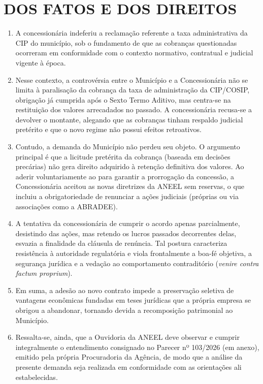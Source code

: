 \newcommand{\tipoRequerimento}{Taxa administrativa da CIP}

\section{DOS FATOS E DOS DIREITOS}

\begin{enumerate}[resume]
    \item A concessionária indeferiu a reclamação referente a taxa administrativa da CIP do município, sob o fundamento de que as cobranças questionadas ocorreram em conformidade com o contexto normativo, contratual e judicial vigente à época.

    \item Nesse contexto, a controvérsia entre o Município e a Concessionária não se limita à paralisação da cobrança da taxa de administração da CIP/COSIP, obrigação já cumprida após o Sexto Termo Aditivo, mas centra-se na restituição dos valores arrecadados no passado. A concessionária recusa-se a devolver o montante, alegando que as cobranças tinham respaldo judicial pretérito e que o novo regime não possui efeitos retroativos.

    \item Contudo, a demanda do Município não perdeu seu objeto. O argumento principal é que a licitude pretérita da cobrança (baseada em decisões precárias) não gera direito adquirido à retenção definitiva dos valores. Ao aderir voluntariamente ao \termoCIP{} para garantir a prorrogação da concessão, a Concessionária aceitou as novas diretrizes da ANEEL sem reservas, o que incluiu a obrigatoriedade de renunciar a ações judiciais (próprias ou via associações como a ABRADEE).

    \item A tentativa da concessionária de cumprir o acordo apenas parcialmente, desistindo das ações, mas retendo os lucros passados decorrentes delas, esvazia a finalidade da cláusula de renúncia. Tal postura caracteriza resistência à autoridade regulatória e viola frontalmente a boa-fé objetiva, a segurança jurídica e a vedação ao comportamento contraditório (\textit{venire contra factum proprium}).

    \item Em suma, a adesão ao novo contrato impede a preservação seletiva de vantagens econômicas fundadas em teses jurídicas que a própria empresa se obrigou a abandonar, tornando devida a recomposição patrimonial ao Município.

    \item Ressalta-se, ainda, que a Ouvidoria da ANEEL deve observar e cumprir integralmente o entendimento consignado no Parecer nº 103/2026 (em anexo), emitido pela própria Procuradoria da Agência, de modo que a análise da presente demanda seja realizada em conformidade com as orientações ali estabelecidas.

\end{enumerate}

